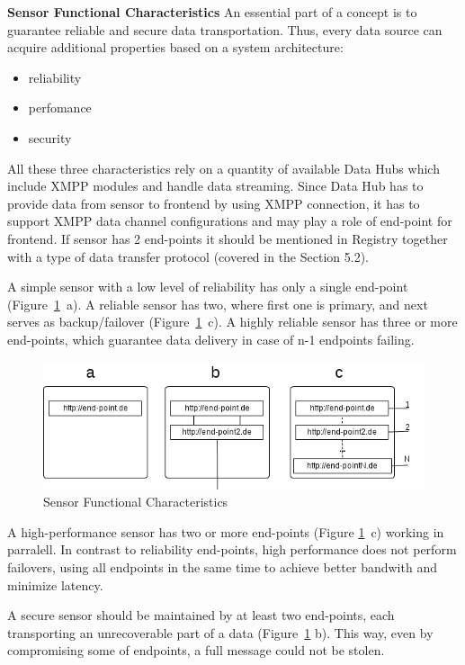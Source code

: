   \textbf{Sensor Functional Characteristics}
  \newline
  An essential part of a concept is to guarantee reliable and secure data transportation. Thus, every data source can acquire additional properties based on a system architecture:
  \begin{itemize}
  \item reliability
  \item perfomance
  \item security
  \end{itemize}
  All these three characteristics rely on a quantity of available Data Hubs which include XMPP modules and handle data streaming. Since Data Hub has to provide data from sensor to frontend by using XMPP connection, it has to support XMPP data channel configurations and may play a role of end-point for frontend. If sensor has 2 end-points it should be mentioned in Registry together with a type of data transfer protocol (covered in the Section 5.2).

  A simple sensor with a low level of reliability has only a single end-point (Figure~\ref{img:end_points}~a). A reliable sensor has two, where first one is primary, and next serves as backup/failover (Figure~\ref{img:end_points}~c). A highly reliable sensor has three or more end-points, which guarantee data delivery in case of n-1 endpoints failing. 
     \begin{figure}[!ht]
     \centering
     \includegraphics[scale=0.6]{images/FuncCharacteristics.png}   
     \caption[MVC Pattern]{Sensor Functional Characteristics} 
     \label{img:end_points}                     
     \end{figure}
A high-performance sensor has two or more end-points (Figure \ref{img:end_points}~c) working in parralell. In contrast to reliability end-points, high performance does not perform failovers, using all endpoints in the same time to achieve better bandwith and minimize latency.

A secure sensor should be maintained by at least two end-points, each transporting an unrecoverable part of a data (Figure~\ref{img:end_points} b). This way, even by compromising some of endpoints, a full message could not be stolen. 

